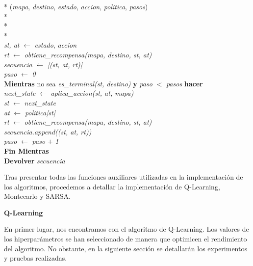 \documentclass[conference,a4paper]{IEEEtran}
\begin{document}
\begin{pseudo}*
    (\textit{mapa}, \textit{destino}, \textit{estado}, \textit{accion}, \textit{politica}, \textit{pasos}) \\*
     \\*
     \\*
     \\
    \textit{st, at} $\leftarrow$ \textit{estado}, \textit{accion} \\
    \textit{rt} $\leftarrow$ \textit{obtiene\_recompensa(mapa, destino, st, at)} \\
    \textit{secuencia} $\leftarrow$ \textit{[(st, at, rt)]} \\
    \textit{paso} $\leftarrow$ \textit{0} \\
    \textbf{Mientras} no sea \textit{es\_terminal(st, destino)} \textbf{y} \textit{paso} $<$ \textit{pasos} \textbf{hacer} \\
    \> \textit{next\_state} $\leftarrow$ \textit{aplica\_accion(st, at, mapa)} \\
    \> \textit{st} $\leftarrow$ \textit{next\_state} \\
    \> \textit{at} $\leftarrow$ \textit{politica[st]} \\
    \> \textit{rt} $\leftarrow$ \textit{obtiene\_recompensa(mapa, destino, st, at)} \\
    \> \textit{secuencia.append((st, at, rt))} \\
    \> \textit{paso} $\leftarrow$ \textit{paso} $+$ \textit{1} \\
    \textbf{Fin Mientras} \\
    \textbf{Devolver} \textit{secuencia}
\end{pseudo}

  
Tras presentar todas las funciones auxiliares utilizadas en la implementación de los algoritmos, procedemos a detallar la implementación de Q-Learning, Montecarlo y SARSA.\newline 

\textbf{Q-Learning \newline}

En primer lugar, nos encontramos con el algoritmo de Q-Learning. Los valores de los hiperparámetros se han seleccionado de manera que optimicen el rendimiento del algoritmo. 
No obstante, en la siguiente sección se detallarán los experimentos y pruebas realizadas.
\end{document}
